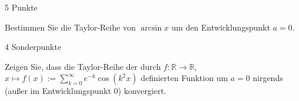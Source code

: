 \documentclass{problemset}
\begin{document}
\begin{problem}{5 Punkte}

Bestimmen Sie die Taylor-Reihe von $\arcsin x$ um den Entwicklungspunkt $a =
0$.
\end{problem}

\begin{problem}{4 Sonderpunkte}

Zeigen Sie, dass die Taylor-Reihe der durch $f : \mathbb{R} \to \mathbb{R}$, $x
\mapsto f(x) := \sum\limits_{k=0}^{\infty} e^{-k} \cos(k^2x)$ definierten
Funktion um $a = 0$ nirgends (außer im Entwicklungspunkt $0$) konvergiert.
\end{problem}
\end{document}
